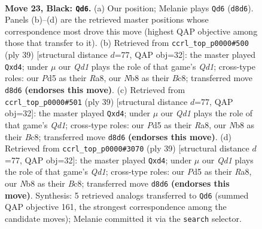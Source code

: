 \documentclass[11pt]{article}
\begin{document}
\clearpage

\begin{figure}[p]\centering
\begin{subfigure}{0.46\textwidth}\centering
\resizebox{\linewidth}{!}{%
\newchessgame
\chessboard[
  setfen={rn1qk3/p3br2/1p2Q3/3pN1P1/P7/2NB4/1P3P2/R1B1K2R b KQ - 0 23},
  showmover=false,
  pgfstyle=straightmove, color=movearrow, markmove={d8-d6}
]}
\caption{}
\end{subfigure}\hfill
\begin{subfigure}{0.46\textwidth}\centering
\resizebox{\linewidth}{!}{%
\newchessgame
\chessboard[
  setfen={r1bqk2r/5pQ1/1pn1p3/6Pp/3NP3/7P/PP2B3/R1B1K2R b KQkq - 0 20},
  showmover=false,
  pgfstyle=straightmove, color=movearrow, markmove={d8-d4}
]}
\caption{}
\end{subfigure}
\\[4pt]
\begin{subfigure}{0.46\textwidth}\centering
\resizebox{\linewidth}{!}{%
\newchessgame
\chessboard[
  setfen={r1bqk2r/5pQ1/1pn1p3/6Pp/3NP3/7P/PP2B3/R1B1K2R b KQkq - 0 20},
  showmover=false,
  pgfstyle=straightmove, color=movearrow, markmove={d8-d4}
]}
\caption{}
\end{subfigure}\hfill
\begin{subfigure}{0.46\textwidth}\centering
\resizebox{\linewidth}{!}{%
\newchessgame
\chessboard[
  setfen={r1bqk2r/5pQ1/1pn1p3/6Pp/3NP3/7P/PP2B3/R1B1K2R b KQkq - 0 20},
  showmover=false,
  pgfstyle=straightmove, color=movearrow, markmove={d8-d4}
]}
\caption{}
\end{subfigure}
\caption{\textbf{Move 23, Black: \texttt{Qd6}.} (a) Our position; Melanie plays \texttt{Qd6} (\texttt{d8d6}). Panels (b)--(d) are the retrieved master positions whose correspondence most drove this move (highest QAP objective among those that transfer to it). (b) Retrieved from \texttt{ccrl\_top\_p0000\#500} (ply 39) [structural distance $d$=77, QAP obj=32]: the master played \texttt{Qxd4}; under $\mu$ our \emph{Qd1} plays the role of that game's \emph{Qd1}; cross-type roles: our \emph{P}d5 as their \emph{R}a8, our \emph{N}b8 as their \emph{B}c8; transferred move \texttt{d8d6} \textbf{(endorses this move)}. (c) Retrieved from \texttt{ccrl\_top\_p0000\#501} (ply 39) [structural distance $d$=77, QAP obj=32]: the master played \texttt{Qxd4}; under $\mu$ our \emph{Qd1} plays the role of that game's \emph{Qd1}; cross-type roles: our \emph{P}d5 as their \emph{R}a8, our \emph{N}b8 as their \emph{B}c8; transferred move \texttt{d8d6} \textbf{(endorses this move)}. (d) Retrieved from \texttt{ccrl\_top\_p0000\#3070} (ply 39) [structural distance $d$=77, QAP obj=32]: the master played \texttt{Qxd4}; under $\mu$ our \emph{Qd1} plays the role of that game's \emph{Qd1}; cross-type roles: our \emph{P}d5 as their \emph{R}a8, our \emph{N}b8 as their \emph{B}c8; transferred move \texttt{d8d6} \textbf{(endorses this move)}. Synthesis: 5 retrieved analogs transferred to \texttt{Qd6} (summed QAP objective 161, the strongest correspondence among the candidate moves); Melanie committed it via the \texttt{search} selector.}
\label{fig:thought-m45}
\end{figure}
\end{document}

